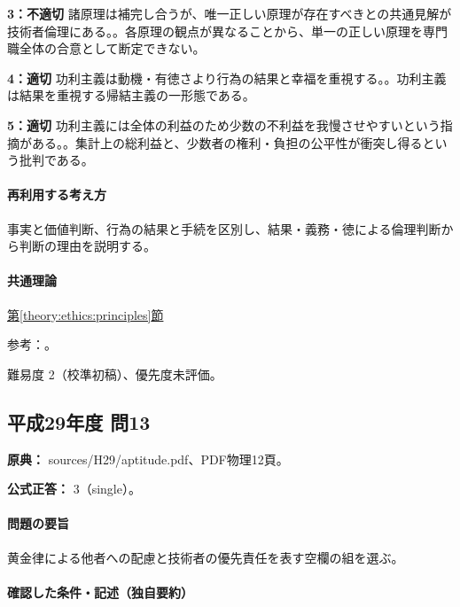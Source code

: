 \noindent\textbf{3：不適切} 諸原理は補完し合うが、唯一正しい原理が存在すべきとの共通見解が技術者倫理にある。。各原理の観点が異なることから、単一の正しい原理を専門職全体の合意として断定できない。\par

\noindent\textbf{4：適切} 功利主義は動機・有徳さより行為の結果と幸福を重視する。。功利主義は結果を重視する帰結主義の一形態である。\par

\noindent\textbf{5：適切} 功利主義には全体の利益のため少数の不利益を我慢させやすいという指摘がある。。集計上の総利益と、少数者の権利・負担の公平性が衝突し得るという批判である。\par

\paragraph{再利用する考え方} 事実と価値判断、行為の結果と手続を区別し、結果・義務・徳による倫理判断から判断の理由を説明する。

\paragraph{共通理論} \hyperref[theory:ethics:principles]{第\ref*{theory:ethics:principles}節}

\par 参考：\cite{scu_ethics_framework}。

\par 難易度 2（校準初稿）、優先度未評価。

\subsection{平成29年度 問13}
\label{q:h29-reg-apt-13}

\noindent\textbf{原典：} sources/H29/aptitude.pdf、PDF物理12頁。

\textbf{公式正答：} 3（single）。

\paragraph{問題の要旨} 黄金律による他者への配慮と技術者の優先責任を表す空欄の組を選ぶ。

\paragraph{確認した条件・記述（独自要約）}\mbox{}\par


